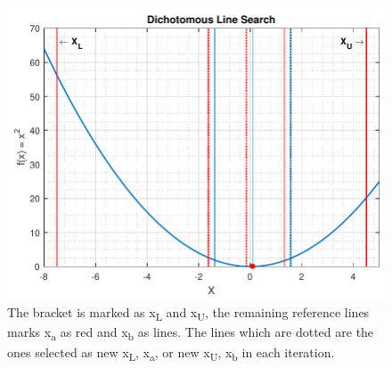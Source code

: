 \begin{figure}[H]
	\centering
	\includegraphics[width=.5\textwidth]{figures/dichotomousLineSearchComprehension.pdf}
	\caption{The bracket is marked as \si{x_{L}} and \si{x_{U}}, the remaining reference lines marks \si{x_a} as red and \si{x_b} as lines. The lines which are dotted are the ones selected as new \si{x_{L}}, \si{x_a}, or new \si{x_{U}}, \si{x_b} in each iteration.}
	\label{dichotomousLineSearchComprehensive}
\end{figure}\vspace{-18pt}
%